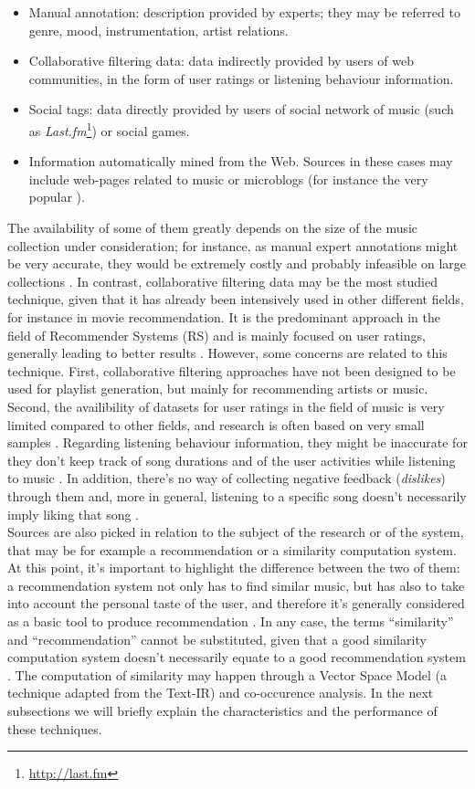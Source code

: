 \begin{itemize}
\item Manual annotation: description provided by experts; they may be referred to genre, mood, instrumentation, artist relations.
\item Collaborative filtering data: data indirectly provided by users of web communities, in the form of user ratings or listening behaviour information.
\item Social tags: data directly provided by users of social network of music (such as \textit{Last.fm}\footnote{\url{http://last.fm}}) or social games.
\item Information automatically mined from the Web. Sources in these cases may include web-pages related to music or microblogs (for instance the very popular ).
\end{itemize}
 The availability of some of them greatly depends on the size of the music collection under consideration; for instance, as manual expert annotations might be very accurate, they would be extremely costly and probably infeasible on large collections \cite{Szyma09}. In contrast, collaborative filtering data may be the most studied technique, given that it has already been intensively used in other different fields, for instance in movie recommendation. It is the predominant approach in the field of Recommender Systems (RS) \cite{jannach12} and is mainly focused on user ratings, generally leading to better results \cite{green09}. However, some concerns are related to this technique. First, collaborative filtering approaches have not been designed to be used for playlist generation, but mainly for recommending artists or music. Second, the availibility of datasets for user ratings in the field of music is very limited compared to other fields, and research is often based on very small samples \cite{liu09}. Regarding listening behaviour information, they might be inaccurate for they don't keep track of song durations and of the user activities while listening to music \cite{jawaheer10}. In addition, there's no way of collecting negative feedback (\textit{dislikes}) through them and, more in general, listening to a specific song doesn't necessarily imply liking that song \cite{bogdanov13}. \\Sources are also picked in relation to the subject of the research or of the system, that may be for example a recommendation or a similarity computation system. At this point, it's important to highlight the difference between the two of them: a recommendation system not only has to find similar music, but has also to take into account the personal taste of the user, and therefore it's generally considered as a basic tool to produce recommendation \cite{celma08}. In any case, the terms ``similarity'' and ``recommendation'' cannot be substituted, given that a good similarity computation system doesn't necessarily equate to a good recommendation system \cite{mcnee06}. 
 The computation of similarity may happen through a Vector Space Model (a technique adapted from the Text-IR) and co-occurence analysis. In the next subsections we will briefly explain the characteristics and the performance of these techniques.

